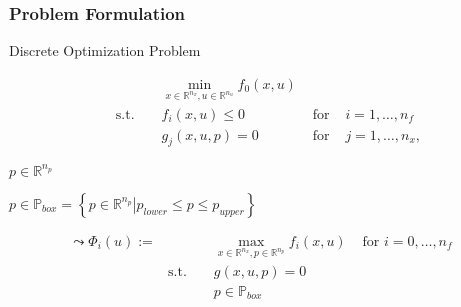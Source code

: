 

\begin{frame}
\frametitle{Problem Formulation}

\begin{block}{Discrete Optimization Problem}

\begin{align*}
 &&& \min_{x\in \mathbb{R}^{n_{x}}, u\in \mathbb{R}^{n_{u}}}  f_{0}(x, u)\\
& \text{ s.t. } &&  f_{i}(x,u) \leq 0 & \text{ for } & i=1,\ldots,n_{f}\\
&&&  g_{j}(x,u,p)=0 & \text{ for } & j=1,\ldots,n_{x},
\end{align*}
	\begin{overprint}

 $p\in \mathbb{R}^{n_{p}}$ 


 $ p\in\mathbb{P}_{box}=\left\{\left. p\in\mathbb{R}^{n_{p}} \right| p_{lower}\leq p \leq p_{upper}\right\}$
\end{overprint}
\end{block}


\begin{align*}
 \leadsto \Phi_{i}(u):= &&& \max_{x\in \mathbb{R}^{n_{x}}, p\in \mathbb{R}^{n_{p}}} f_{i}(x,u)& \text{ for  } i=0,\ldots,n_{f}\\
& \text{s.t. } && g(x,u,p)=0\\
&&& p\in\mathbb{P}_{box}
\end{align*}

\end{frame}

